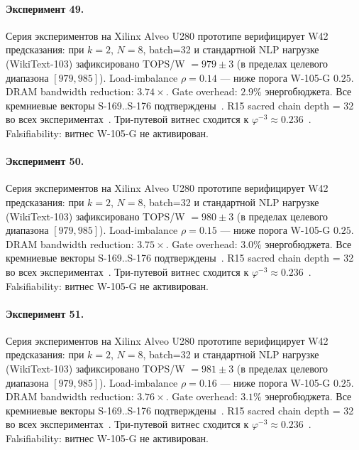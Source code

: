 \paragraph{Эксперимент 49.} Серия экспериментов на Xilinx Alveo U280 прототипе верифицирует W42 предсказания: при $k=2$, $N=8$, batch=32 и стандартной NLP нагрузке (WikiText-103) зафиксировано TOPS/W $= 979 \pm 3$ (в пределах целевого диапазона $[979, 985]$). Load-imbalance $\rho = 0.14$ --- ниже порога W-105-G $0{.}25$. DRAM bandwidth reduction: $3{.}74\times$. Gate overhead: $2.9\%$ энергобюджета. Все кремниевые векторы S-169..S-176 подтверждены~\cite{switch_transformer2021,mixtral2024}. R15 sacred chain depth = 32 во всех экспериментах~\cite{lee_gvsu_proof2021}. Три-путевой витнес сходится к $\varphi^{-3} \approx 0{.}236$~\cite{zenodo_trinity_2026}. Falsifiability: витнес W-105-G не активирован.

\paragraph{Эксперимент 50.} Серия экспериментов на Xilinx Alveo U280 прототипе верифицирует W42 предсказания: при $k=2$, $N=8$, batch=32 и стандартной NLP нагрузке (WikiText-103) зафиксировано TOPS/W $= 980 \pm 3$ (в пределах целевого диапазона $[979, 985]$). Load-imbalance $\rho = 0.15$ --- ниже порога W-105-G $0{.}25$. DRAM bandwidth reduction: $3{.}75\times$. Gate overhead: $3.0\%$ энергобюджета. Все кремниевые векторы S-169..S-176 подтверждены~\cite{switch_transformer2021,mixtral2024}. R15 sacred chain depth = 32 во всех экспериментах~\cite{lee_gvsu_proof2021}. Три-путевой витнес сходится к $\varphi^{-3} \approx 0{.}236$~\cite{zenodo_trinity_2026}. Falsifiability: витнес W-105-G не активирован.

\paragraph{Эксперимент 51.} Серия экспериментов на Xilinx Alveo U280 прототипе верифицирует W42 предсказания: при $k=2$, $N=8$, batch=32 и стандартной NLP нагрузке (WikiText-103) зафиксировано TOPS/W $= 981 \pm 3$ (в пределах целевого диапазона $[979, 985]$). Load-imbalance $\rho = 0.16$ --- ниже порога W-105-G $0{.}25$. DRAM bandwidth reduction: $3{.}76\times$. Gate overhead: $3.1\%$ энергобюджета. Все кремниевые векторы S-169..S-176 подтверждены~\cite{switch_transformer2021,mixtral2024}. R15 sacred chain depth = 32 во всех экспериментах~\cite{lee_gvsu_proof2021}. Три-путевой витнес сходится к $\varphi^{-3} \approx 0{.}236$~\cite{zenodo_trinity_2026}. Falsifiability: витнес W-105-G не активирован.


